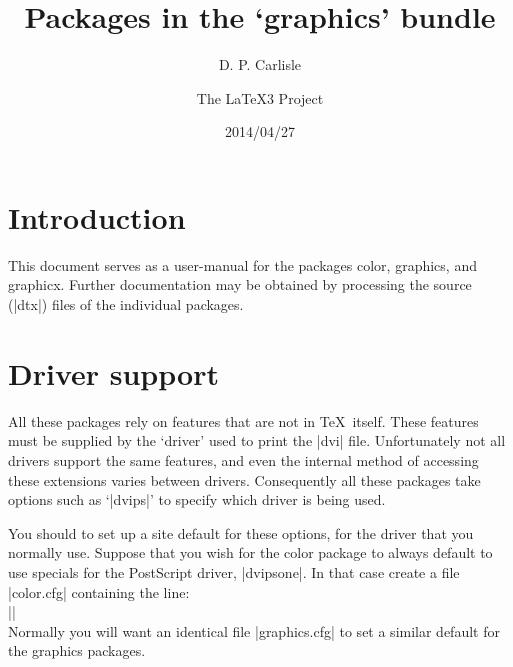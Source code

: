 

\renewcommand\star{{\ttfamily*}}

\let\package\textsf

\newlength{\gxlen}
\settowidth{\gxlen}{\package{graphicx}: }
\newcommand\gs{\makebox[\gxlen][l]{\package{graphics}:}}
\newcommand\gx{\makebox[\gxlen][l]{\package{graphicx}:}}

\MakeShortVerb{\|}


\title{Packages in the `graphics' bundle}
\author{D. P. Carlisle \and The \LaTeX3 Project}
\date{2014/04/27}

\maketitle

\tableofcontents

\section{Introduction}
This document serves as a user-manual for the packages \package{color},
\package{graphics}, and \package{graphicx}. Further documentation may be
obtained by processing the  source (|dtx|) files of the individual
packages.

\section{Driver support}\label{drivers}
All these packages rely on features that are not in \TeX\ itself.
These features must be supplied by the `driver' used to print the
|dvi| file. Unfortunately not all drivers support the same features, and
even the internal method of accessing these extensions varies between
drivers. Consequently all these packages take options such as
`|dvips|' to specify which driver is being used.

You should to set up a site default for these
options, for the driver that you normally use. Suppose that you wish for
the \package{color} package to always default to use specials for the
PostScript driver, |dvipsone|. In that case create a file |color.cfg|
containing the line:\\
||\\
Normally you will want an identical file |graphics.cfg| to set a similar
default for the graphics packages.

